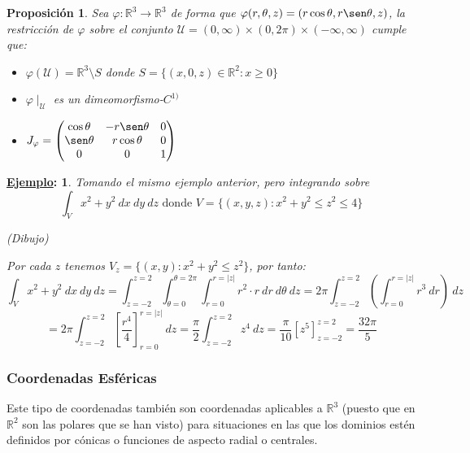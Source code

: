 \documentclass[10pt,a4paper,openright]{book}
\theoremstyle{break}
\newtheorem*{prop}{Proposición}
\newtheorem*{ej}{\underline{Ejemplo}:}
\newcommand{\dif}[1]{\ d#1}
\begin{document}
\begin{prop}
Sea $\varphi: \mathbb{R}^3\rightarrow  \mathbb{R}^3$ de forma que $\varphi(r, \theta, z) = (r\cos\theta, r\sen\theta, z)$, la restricción de $\varphi$ sobre el conjunto $\mathcal{U} = (0,\infty)\times (0, 2\pi) \times (-\infty, \infty)$ cumple que:
\begin{itemize}
\item $\varphi(\mathcal{U}) = \mathbb{R}^3\setminus{S}$ donde $S = \{(x,0,z)\in \mathbb{R}^2: x\geq 0\}$
\item $\varphi\mid_\mathcal{U}$ es un dimeomorfismo-$C^{1)}$
\item $J_\varphi = \begin{pmatrix}\cos \theta & -r\sen \theta & 0 \\ \sen \theta & r\cos \theta & 0 \\ 0 & 0 & 1\end{pmatrix}$
\end{itemize}
\end{prop}

\begin{ej}
Tomando el mismo ejemplo anterior, pero integrando sobre
$$\int_V x^2 + y^2 \dif{x} \dif{y} \dif{z} \mbox{ donde } V = \{\left(x, y, z\right) : x^2 + y^2 \le z^2 \le 4\}$$

(\textit{Dibujo})

Por cada $z$ tenemos $V_z = \{\left(x, y\right): x^2 + y^2 \le z^2\}$, por tanto: 
$$\int_V x^2 + y^2 \dif{x} \dif{y} \dif{z} = \int_{z = -2}^{z = 2} \int_{\theta = 0}^{\theta = 2\pi} \int_{r = 0}^{r = \lvert z \rvert} r^2 \cdot r  \dif{r}   \dif{\theta} \dif{z}  = 2\pi \int_{z = -2}^{z = 2} \left(\int_{r = 0}^{r = \lvert z \rvert} r^3 \dif{r} \right) \dif{z}$$
$$ = 2\pi \int_{z = -2}^{z = 2} \left[\frac{r^4}{4}\right]_{r = 0}^{r = \lvert z \rvert} \dif{z} = \frac{\pi}{2} \int_{z = -2}^{z = 2} z^4 \dif{z} = \frac{\pi}{10} \left[z^{5}\right]_{z = -2}^{z = 2} = \frac{32\pi}{5} $$
\end{ej}

\subsubsection*{Coordenadas Esféricas}
Este tipo de coordenadas también son coordenadas aplicables a $\mathbb{R}^3$ (puesto que en $\mathbb{R}^2$ son las polares que se han visto) para situaciones en las que los dominios estén definidos por cónicas o funciones de aspecto radial o centrales.
\end{document}

